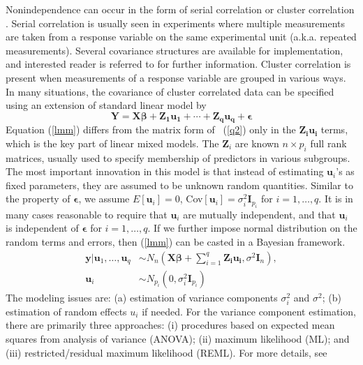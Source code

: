 	Nonindependence can occur in the form of serial correlation or cluster correlation \citep[chapter~17]{rencher2008linear}. Serial correlation is usually seen in experiments where multiple measurements  are taken from a response variable on the same experimental unit (a.k.a. repeated measurements). Several covariance structures are available for implementation, and interested reader is referred to \cite[chapter~5]{littell2006sas} for further information.  Cluster correlation is present when measurements of a response variable are grouped in various ways. In many situations, the covariance of cluster correlated data can be specified using an extension of standard linear model by 
		\begin{equation}\label{lmm}
			\bm Y = \bm {X\beta} + \bm {Z_1u_1}+\cdots + \bm {Z_qu_q} + \bm \epsilon	
		\end{equation}
	Equation (\ref{lmm}) differs from the matrix form of ~(\ref{q2}) only in the $\bm {Z_iu_i}$ terms, which is the key part of linear mixed models.  The $\bm Z_i$  are known $n\times p_i$ full rank matrices, usually used to specify membership of predictors in various subgroups. The most important innovation in this model is that instead of estimating $\bm u_i$'s as fixed parameters, they are assumed to be unknown random quantities. Similar to the property of  $\bm \epsilon$, we assume $E[\bm u_i]=0$, Cov$[\bm u_i]= \sigma_i^2 \bm I_{p_i}$ for $i=1, \ldots, q$. It is in many cases reasonable to  require that $\bm u_i$ are mutually independent, and that $\bm u_i$ is independent of $\bm \epsilon$ for $i=1, \ldots, q$. If we further impose normal distribution on the random terms and errors, then (\ref{lmm}) can be casted in a Bayesian framework.
		\begin{equation}\label{lmmGuass}
		\begin{split}
			\bm y|\bm u_1, \ldots, \bm u_q   & \sim  N_n(\bm {X\beta} + \sum_{i=1}^q \bm {Z_iu_i}, \sigma^2\bm I_n),  \\
			\bm u_i &\sim N_{p_i}(0, \sigma_i^2 \bm I_{p_i})
		\end{split}
		\end{equation}
	The modeling issues are: (a) estimation of variance components $\sigma_i^2$ and $\sigma^2$; (b) estimation of random effects $u_i$ if needed. For the variance component estimation, there are primarily three approaches: (i) procedures based on expected mean squares from analysis of variance (ANOVA); (ii) maximum likelihood (ML); and (iii) restricted/residual maximum likelihood (REML). For more details, see \cite[Chapter 1]{littell2006sas}


